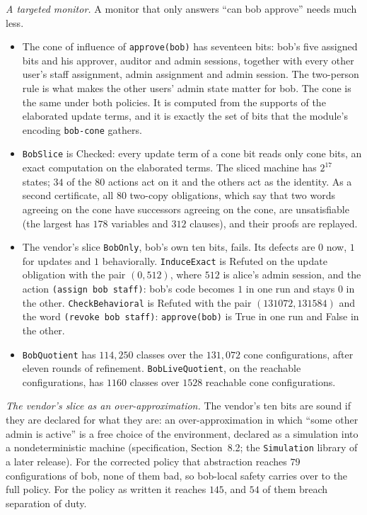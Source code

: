 \documentclass[11pt]{article}
\newcommand{\code}[1]{\texttt{#1}}
\newcommand{\spec}[1]{specification, Section~#1}
\theoremstyle{definition}
\theoremstyle{plain}
\begin{document}
\emph{A targeted monitor.} A monitor that only answers ``can bob approve'' needs much less.
\begin{itemize}
\item The cone of influence of \code{approve(bob)} has seventeen bits: bob's five assigned bits and
his approver, auditor and admin sessions, together with every other user's staff assignment, admin
assignment and admin session. The two-person rule is what makes the other users' admin state
matter for bob. The cone is the same under both policies. It is computed from the supports of the
elaborated update terms, and it is exactly the set of bits that the module's encoding
\code{bob-cone} gathers.
\item \code{BobSlice} is Checked: every update term of a cone bit reads only cone bits, an exact
computation on the elaborated terms. The sliced machine has $2^{17}$ states; $34$ of the $80$ actions
act on it and the others act as the identity. As a second certificate, all $80$ two-copy
obligations, which say that two words agreeing on the cone have successors agreeing on the cone, are
unsatisfiable (the largest has $178$ variables and $312$ clauses), and their proofs are replayed.
\item The vendor's slice \code{BobOnly}, bob's own ten bits, fails. Its defects are $0$ now, $1$
for updates and $1$ behaviorally. \code{InduceExact} is Refuted on the update obligation with the
pair $(0,512)$, where $512$ is alice's admin session, and the action \code{(assign bob staff)}: bob's
code becomes $1$ in one run and stays $0$ in the other. \code{CheckBehavioral} is Refuted with the
pair $(131072,131584)$ and the word \code{(revoke bob staff)}: \code{approve(bob)} is True in one run
and False in the other.
\item \code{BobQuotient} has $114{,}250$ classes over the $131{,}072$ cone configurations, after
eleven rounds of refinement. \code{BobLiveQuotient}, on the reachable configurations, has $1160$
classes over $1528$ reachable cone configurations.
\end{itemize}

\emph{The vendor's slice as an over-approximation.} The vendor's ten bits are sound if they are
declared for what they are: an over-approximation in which ``some other admin is active'' is a free
choice of the environment, declared as a simulation into a nondeterministic machine (\spec{8.2}; the
\code{Simulation} library of a later release). For the corrected policy that abstraction reaches $79$
configurations of bob, none of them bad, so bob-local safety carries over to the full policy. For the
policy as written it reaches $145$, and $54$ of them breach separation of duty.
\end{document}

